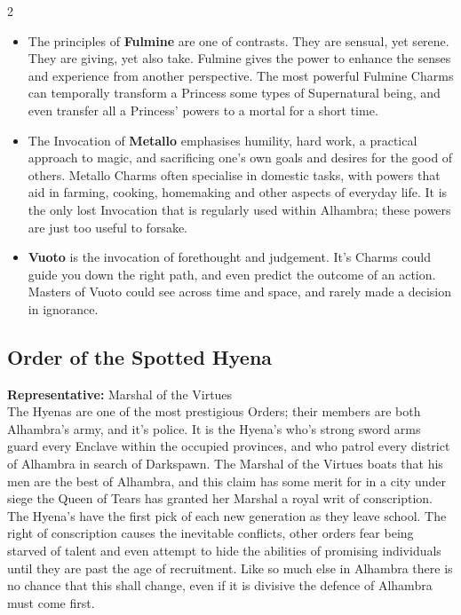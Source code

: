 \begin{multicols}{2}
\begin{itemize}
 \item The principles of \textbf{Fulmine} are one of contrasts. They are sensual, yet serene. They are giving, yet also take. Fulmine gives the power to enhance the senses and experience from another perspective. The most powerful Fulmine Charms can temporally transform a Princess some types of Supernatural being, and even transfer all a Princess' powers to a mortal for a short time. 
 \item The Invocation of \textbf{Metallo} emphasises humility, hard work, a practical approach to magic, and sacrificing one's own goals and desires for the good of others. Metallo Charms often specialise in domestic tasks, with powers that aid in farming, cooking, homemaking and other aspects of everyday life. It is the only lost Invocation that is regularly used within Alhambra; these powers are just too useful to forsake. 
 \item \textbf{Vuoto} is the invocation of forethought and judgement. It's Charms could guide you down the right path, and even predict the outcome of an action. Masters of Vuoto could see across time and space, and rarely made a decision in ignorance. 
\end{itemize}


\subsection*{Order of the Spotted Hyena}

\textbf{Representative:} Marshal of the Virtues\\

\noindent The Hyenas are one of the most prestigious Orders; their members are both Alhambra's army, and it's police. It is the Hyena's who's strong sword arms guard every Enclave within the occupied provinces, and who patrol every district of Alhambra in search of Darkspawn. The Marshal of the Virtues boats that his men are the best of Alhambra, and this claim has some merit for in a city under siege the Queen of Tears has granted her Marshal a royal writ of conscription. The Hyena's have the first pick of each new generation as they leave school. The right of conscription causes the inevitable conflicts, other orders fear being starved of talent and even attempt to hide the abilities of promising individuals until they are past the age of recruitment. Like so much else in Alhambra there is no chance that this shall change, even if it is divisive the defence of Alhambra must come first. 


\end{multicols}
